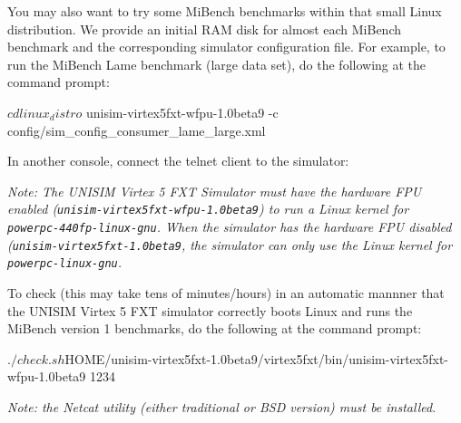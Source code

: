 You may also want to try some MiBench benchmarks within that small Linux distribution.
We provide an initial RAM disk for almost each MiBench benchmark and the corresponding simulator configuration file.
\noindent For example, to run the MiBench Lame benchmark (large data set), do the following at the command prompt:

\begin{script}
   $ cd linux_distro
   $ unisim-virtex5fxt-wfpu-1.0beta9 -c config/sim_config_consumer_lame_large.xml
\end{script}

\noindent In another console, connect the telnet client to the simulator:

\textit{Note: The UNISIM Virtex 5 FXT Simulator must have the hardware FPU enabled (\texttt{unisim\--virtex5fxt\--wfpu\--1.0beta9}) to run a Linux kernel for \texttt{powerpc\--440fp\--linux\--gnu}.
When the simulator has the hardware FPU disabled (\texttt{unisim\--virtex5fxt\--1.0beta9}, the simulator can only use the Linux kernel for \texttt{powerpc\--linux\--gnu}.}

To check (this may take tens of minutes/hours) in an automatic mannner that the UNISIM Virtex 5 FXT simulator correctly boots Linux and runs the MiBench version 1 benchmarks, do the following at the command prompt:
\begin{script}
   $ ./check.sh ${HOME}/unisim-virtex5fxt-1.0beta9/virtex5fxt/bin/unisim-virtex5fxt-wfpu-1.0beta9 1234
\end{script}
\textit{Note: the Netcat utility (either traditional or BSD version) must be installed}.

